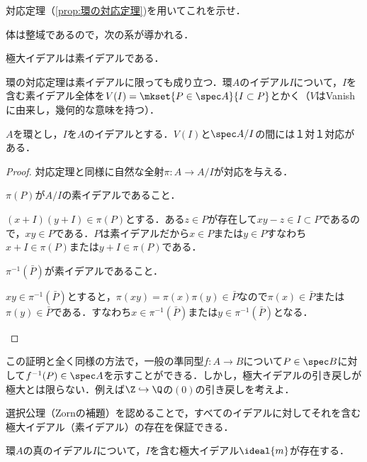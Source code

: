 \begin{exer}
	対応定理（\ref{prop:環の対応定理})を用いてこれを示せ．
\end{exer}

体は整域であるので，次の系が導かれる．

\begin{cor}
	極大イデアルは素イデアルである．
\end{cor}

環の対応定理は素イデアルに限っても成り立つ．環$A$のイデアル$I$について，$I$を含む素イデアル全体を$V(I)=\mkset{P\in\spec A}{I\subset P}$とかく（$V$はVanishに由来し，幾何的な意味を持つ）．

\begin{prop}[素イデアルの対応定理]\label{prop:素イデアルの対応定理}
	$A$を環とし，$I$を$A$のイデアルとする．$V(I)$と$\spec A/I$の間には１対１対応がある．
\end{prop}
\begin{proof}
	対応定理と同様に自然な全射$\pi:A\to A/I$が対応を与える．
	\begin{step}
		\item $\pi(P)$が$A/I$の素イデアルであること．
		
		 $(x+I)(y+I)\in\pi(P)$とする．ある$z\in P$が存在して$xy-z\in I\subset P$であるので，$xy\in P$である．$P$は素イデアルだから$x\in P$または$y\in P$すなわち$x+I\in\pi(P)$または$y+I\in\pi(P)$である．
		
		\item $\pi^{-1}(\bar{P})$が素イデアルであること．
		
		$xy\in\pi^{-1}(\bar{P})$とすると，$\pi(xy)=\pi(x)\pi(y)\in\bar{P}$なので$\pi(x)\in \bar{P}$または$\pi(y)\in \bar{P}$である．すなわち$x\in\pi^{-1}(\bar{P})$または$y\in\pi^{-1}(\bar{P})$となる．
	\end{step}
\end{proof}

この証明と全く同様の方法で，一般の準同型$f:A\to B$について$P\in\spec B$に対して$f^{-1}(P)\in\spec A$を示すことができる．しかし，極大イデアルの引き戻しが極大とは限らない．例えば$\Z\hookrightarrow\Q$の$(0)$の引き戻しを考えよ．

選択公理（Zornの補題）を認めることで，すべてのイデアルに対してそれを含む極大イデアル（素イデアル）の存在を保証できる．

\begin{thm}[Krullの極大イデアル存在定理]
	環$A$の真のイデアル$I$について，$I$を含む極大イデアル$\ideal{m}$が存在する．
\end{thm}

